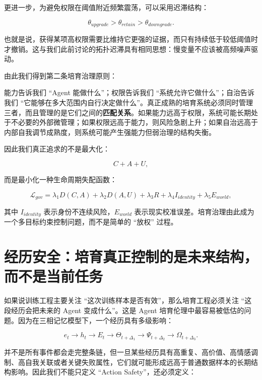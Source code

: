 更进一步，为避免权限在阈值附近频繁震荡，可以采用迟滞结构：

\[
\theta_{upgrade}
>
\theta_{retain}
>
\theta_{downgrade}.
\]

也就是说，获得某项高权限需要比维持它更强的证据，而只有持续低于较低阈值时才撤销。这与我们此前讨论的拓扑迟滞具有相同思想：慢变量不应该被高频噪声驱动。

由此我们得到第二条培育治理原则：

\begin{statementbox}
\centering
{}
\end{statementbox}

能力告诉我们 ``Agent 能做什么''；权限告诉我们 ``系统允许它做什么''；自治告诉我们 ``它能够在多大范围内自行决定做什么''。真正成熟的培育系统必须同时管理三者，而且管理的是它们之间的\textbf{匹配关系}。如果能力远高于权限，系统可能长期处于不必要的外部微管理；如果权限远高于能力，则风险急剧上升；如果自治远高于内部自我调节成熟度，则系统可能产生强能力但弱治理的结构失衡。

因此我们真正追求的不是最大化：

\[
C+A+U,
\]

而是最小化一种生命周期失配函数：

\[
\mathcal L_{gov}
=
\lambda_1 D(C,A)
+
\lambda_2 D(A,U)
+
\lambda_3 R
+
\lambda_4 I_{identity}
+
\lambda_5 E_{world},
\]

其中 $I_{identity}$ 表示身份不连续风险，$E_{world}$ 表示现实校准误差。培育治理由此成为一个多目标约束控制问题，而不是简单的 ``放权'' 过程。

\section{经历安全：培育真正控制的是未来结构，而不是当前任务}

如果说训练工程主要关注 ``这次训练样本是否有效''，那么培育工程必须关注 ``这段经历会把未来的 Agent 变成什么''。这是 Agent 培育伦理中最容易被低估的问题。因为在三相记忆模型下，一个经历具有多级影响：

\[
e_t
\rightarrow
h_t
\rightarrow
E_t
\rightarrow
\Theta_{t+\Delta_1}
\rightarrow
\Psi_{t+\Delta_2}
\rightarrow
\Omega_{t+\Delta_3}.
\]

并不是所有事件都会走完整条链，但一旦某些经历具有高重复、高价值、高情感调制、高自我关联或者关键失败属性，它们就可能形成远高于普通数据样本的长期结构影响。因此我们不能只定义 ``Action Safety''，还必须定义：

